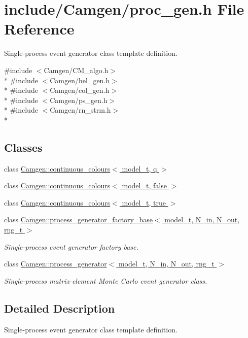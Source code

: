 \hypertarget{a00730}{}\section{include/\+Camgen/proc\+\_\+gen.h File Reference}
\label{a00730}


Single-\/process event generator class template definition.  


{\ttfamily \#include $<$Camgen/\+C\+M\+\_\+algo.\+h$>$}\\*
{\ttfamily \#include $<$Camgen/hel\+\_\+gen.\+h$>$}\\*
{\ttfamily \#include $<$Camgen/col\+\_\+gen.\+h$>$}\\*
{\ttfamily \#include $<$Camgen/ps\+\_\+gen.\+h$>$}\\*
{\ttfamily \#include $<$Camgen/rn\+\_\+strm.\+h$>$}\\*
\subsection*{Classes}
\begin{DoxyCompactItemize}
\item 
class \hyperlink{a00103}{Camgen\+::continuous\+\_\+colours$<$ model\+\_\+t, q $>$}
\item 
class \hyperlink{a00104}{Camgen\+::continuous\+\_\+colours$<$ model\+\_\+t, false $>$}
\item 
class \hyperlink{a00105}{Camgen\+::continuous\+\_\+colours$<$ model\+\_\+t, true $>$}
\item 
class \hyperlink{a00438}{Camgen\+::process\+\_\+generator\+\_\+factory\+\_\+base$<$ model\+\_\+t, N\+\_\+in, N\+\_\+out, rng\+\_\+t $>$}
\begin{DoxyCompactList}\small\item\em Single-\/process event generator factory base. \end{DoxyCompactList}\item 
class \hyperlink{a00436}{Camgen\+::process\+\_\+generator$<$ model\+\_\+t, N\+\_\+in, N\+\_\+out, rng\+\_\+t $>$}
\begin{DoxyCompactList}\small\item\em Single-\/process matrix-\/element Monte Carlo event generator class. \end{DoxyCompactList}\end{DoxyCompactItemize}


\subsection{Detailed Description}
Single-\/process event generator class template definition. 

